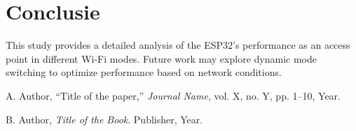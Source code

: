 \documentclass[conference]{IEEEtran}
\begin{document}
\section{Conclusie}
This study provides a detailed analysis of the ESP32's performance as an access point in different Wi-Fi modes. Future work may explore dynamic mode switching to optimize performance based on network conditions. \lipsum[13]

\begin{thebibliography}{1}
 A. Author, ``Title of the paper,'' \emph{Journal Name}, vol. X, no. Y, pp. 1--10, Year.

 B. Author, \emph{Title of the Book}. Publisher, Year.
\end{thebibliography}
\end{document}
